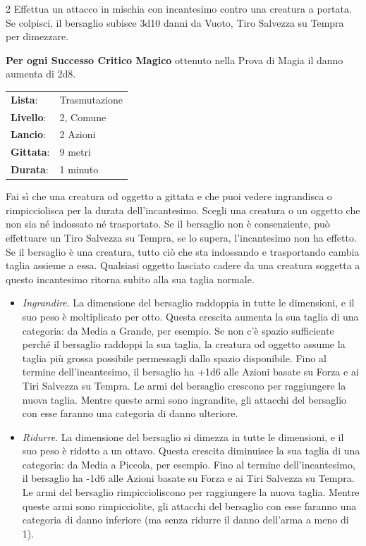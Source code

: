 \begin{multicols}{2}
Effettua un attacco in mischia con incantesimo contro una creatura a portata. Se colpisci, il bersaglio subisce 3d10 danni da Vuoto, Tiro Salvezza su Tempra per dimezzare.

\textbf{Per ogni Successo Critico Magico} ottenuto nella Prova di Magia il danno aumenta di 2d8.

\noindent\begin{tabularx}{\linewidth}{p{1.9cm}X}
	\rowcolor{gray!20}\textbf{Lista}: & Trasmutazione \\
	\textbf{Livello}: & 2, Comune \\
	\rowcolor{gray!20}\textbf{Lancio}: & 2 Azioni \\
	\textbf{Gittata}: & 9 metri \\
	\rowcolor{gray!20}\textbf{Durata}: & 1 minuto \\
\end{tabularx}\smallskip

Fai sì che una creatura od oggetto a gittata e che puoi vedere ingrandisca o rimpicciolisca per la durata dell'incantesimo. Scegli una creatura o un oggetto che non sia né indossato né trasportato. Se il bersaglio non è consenziente, può effettuare un Tiro Salvezza su Tempra, se lo supera, l'incantesimo non ha effetto. Se il bersaglio è una creatura, tutto ciò che sta indossando e trasportando cambia taglia assieme a essa. Qualsiasi oggetto lasciato cadere da una creatura soggetta a questo incantesimo ritorna subito alla sua taglia normale.

\begin{itemize}[leftmargin=*] \setlength{\itemsep}{0pt}
	\item \emph{Ingrandire}. La dimensione del bersaglio raddoppia in tutte le dimensioni, e il suo peso è moltiplicato per otto. Questa crescita aumenta la sua taglia di una categoria: da Media a Grande, per esempio. Se non c'è spazio sufficiente perché il bersaglio raddoppi la sua taglia, la creatura od oggetto assume la taglia più grossa possibile permessagli dallo spazio disponibile. Fino al termine dell'incantesimo, il bersaglio ha +1d6 alle Azioni basate su Forza e ai Tiri Salvezza su Tempra. Le armi del bersaglio crescono per raggiungere la nuova taglia. Mentre queste armi sono ingrandite, gli attacchi del bersaglio con esse faranno una categoria di danno ulteriore.
	\item \emph{Ridurre}. La dimensione del bersaglio si dimezza in tutte le dimensioni, e il suo peso è ridotto a un ottavo. Questa crescita diminuisce la sua taglia di una categoria: da Media a Piccola, per esempio. Fino al termine dell'incantesimo, il bersaglio ha -1d6 alle Azioni basate su Forza e ai Tiri Salvezza su Tempra. Le armi del bersaglio rimpiccioliscono per raggiungere la nuova taglia. Mentre queste armi sono rimpicciolite, gli attacchi del bersaglio con esse faranno una categoria di danno inferiore (ma senza ridurre il danno dell'arma a meno di 1).
\end{itemize}


\end{multicols}
